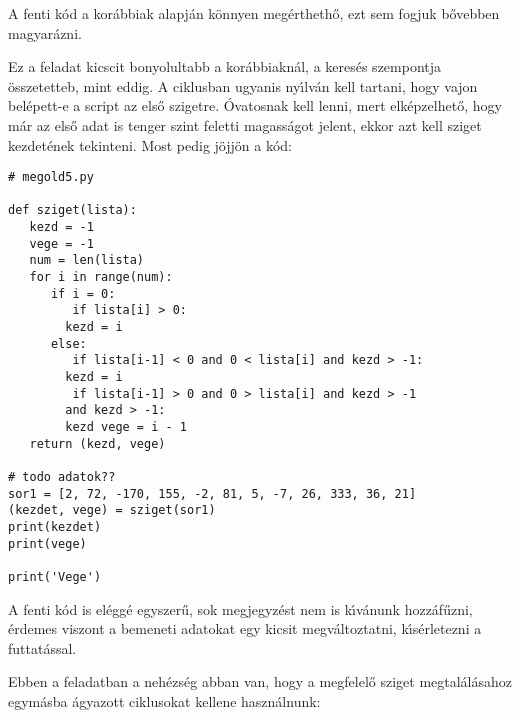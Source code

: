 A fenti k\'od a kor\'abbiak alapj\'an k\"onnyen meg\'ertheth\H{o}, ezt sem fogjuk b\H{o}vebben magyar\'azni.

\themegold

Ez a feladat kicscit bonyolultabb a kor\'abbiakn\'al, a keres\'es szempontja \"osszetetteb, mint eddig. A ciklusban 
ugyanis ny\'{\i}lv\'an kell tartani, hogy vajon bel\'epett-e a script az els\H{o} szigetre. \'Ovatosnak kell lenni, mert 
elk\'epzelhet\H{o}, hogy m\'ar az els\H{o} adat is tenger szint feletti magass\'agot jelent, ekkor azt kell sziget 
kezdet\'enek tekinteni. Most pedig j\"ojj\"on a k\'od:

\begin{Verbatim}[fontsize=\small]
# megold5.py

def sziget(lista):
   kezd = -1
   vege = -1
   num = len(lista)
   for i in range(num):
      if i = 0:
         if lista[i] > 0:
	    kezd = i
      else:
         if lista[i-1] < 0 and 0 < lista[i] and kezd > -1:
	    kezd = i
         if lista[i-1] > 0 and 0 > lista[i] and kezd > -1
	    and kezd > -1:
	    kezd vege = i - 1
   return (kezd, vege)

# todo adatok??
sor1 = [2, 72, -170, 155, -2, 81, 5, -7, 26, 333, 36, 21]
(kezdet, vege) = sziget(sor1)
print(kezdet)
print(vege)

print('Vege')  
\end{Verbatim}

A fenti k\'od is el\'egg\'e egyszer\H{u}, sok megjegyz\'est nem is k\'{\i}v\'anunk hozz\'af\H{u}zni, \'erdemes 
viszont a bemeneti adatokat egy kicsit megv\'altoztatni, k\'{\i}s\'erletezni a futtat\'assal.

\themegold

Ebben a feladatban a neh\'ezs\'eg abban van, hogy a megfelel\H{o} sziget megtal\'al\'asahoz egym\'asba 
\'agyazott ciklusokat kellene haszn\'alnunk:

